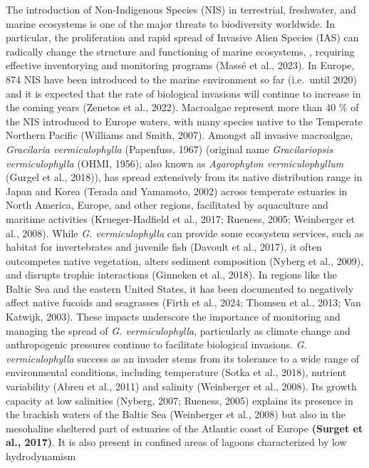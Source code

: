\documentclass[
  letterpaper,
  DIV=11,
  numbers=noendperiod]{scrartcl}
\begin{document}
The introduction of Non-Indigenous Species (NIS) in terrestrial,
freshwater, and marine ecosystems is one of the major threats to
biodiversity worldwide. In particular, the proliferation and rapid
spread of Invasive Alien Species (IAS) can radically change the
structure and functioning of marine ecosystems, , requiring effective
inventorying and monitoring programs (Massé et al., 2023). In Europe,
874 NIS have been introduced to the marine environment so far
(i.e.~until 2020) and it is expected that the rate of biological
invasions will continue to increase in the coming years (Zenetos et al.,
2022). Macroalgae represent more than 40 \% of the NIS introduced to
Europe waters, with many species native to the Temperate Northern
Pacific (Williams and Smith, 2007). Amongst all invasive macroalgae,
\emph{Gracilaria vermiculophylla} (Papenfuss, 1967) (original name
\emph{Gracilariopsis vermiculophylla} (OHMI, 1956); also known as
\emph{Agarophyton vermiculophyllum} (Gurgel et al., 2018)), has spread
extensively from its native distribution range in Japan and Korea
(Terada and Yamamoto, 2002) across temperate estuaries in North America,
Europe, and other regions, facilitated by aquaculture and maritime
activities (Krueger-Hadfield et al., 2017; Rueness, 2005; Weinberger et
al., 2008). While \emph{G. vermiculophylla} can provide some ecosystem
services, such as habitat for invertebrates and juvenile fish (Davoult
et al., 2017), it often outcompetes native vegetation, alters sediment
composition (Nyberg et al., 2009), and disrupts trophic interactions
(Ginneken et al., 2018). In regions like the Baltic Sea and the eastern
United States, it has been documented to negatively affect native
fucoids and seagrasses (Firth et al., 2024; Thomsen et al., 2013; Van
Katwijk, 2003). These impacts underscore the importance of monitoring
and managing the spread of \emph{G. vermiculophylla}, particularly as
climate change and anthropogenic pressures continue to facilitate
biological invasions. \emph{G. vermiculophylla} success as an invader
stems from its tolerance to a wide range of environmental conditions,
including temperature (Sotka et al., 2018), nutrient variability (Abreu
et al., 2011) and salinity (Weinberger et al., 2008). Its growth
capacity at low salinities (Nyberg, 2007; Rueness, 2005) explains its
presence in the brackish waters of the Baltic Sea (Weinberger et al.,
2008) but also in the mesohaline sheltered part of estuaries of the
Atlantic coast of Europe \textbf{(Surget et al., 2017)}. It is also
present in confined areas of lagoons characterized by low hydrodynamism
\end{document}
